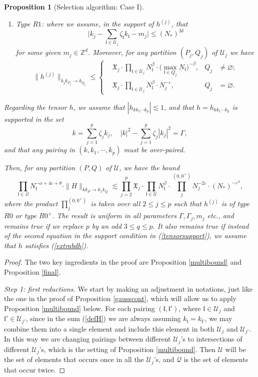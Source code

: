 \documentclass[11 pt,reqno]{amsart}
\newtheorem{prop}[thm]{Proposition}
\theoremstyle{definition}
\theoremstyle{remark}
\numberwithin{equation}{section}
\newcommand{\Qc}{\mathcal{Q}}
\newcommand{\Uc}{\mathcal{U}}
\newcommand{\Zb}{\mathbb{Z}}
\newcommand{\Xf}{\mathfrak{X}}
\newcommand{\lf}{\mathfrak{l}}
\begin{document}
{\begin{prop}[Selection algorithm: Case I]
\begin{enumerate}
\item Type $R1$: where we assume, in the support of $h^{(j)}$, that
\begin{equation}\label{type2}\bigg|k_j-\sum_{\lf\in\Uc_j}\zeta_\lf k_\lf-m_j\bigg|\leq (N_*)^{3\delta}
\end{equation} for some given $m_j\in \Zb^d$. Moreover, for any partition $(P_j,Q_j)$ of $\Uc_j$ we have
\begin{equation}\label{type2bd2}\|h^{(j)}\|_{k_jk_{P_j}\to k_{Q_j}}\leq
\left\{
\begin{aligned}&\Xf_j\cdot \prod_{\lf\in \Uc_j}N_\lf^\beta\cdot \big(\max_{\lf\in Q_j}N_\lf\big)^{-\beta},&Q_j&\neq\varnothing;\\
&\Xf_j\cdot \prod_{\lf\in \Uc_j}N_\lf^\beta\cdot N_j^{-\varepsilon},&Q_j&=\varnothing.
\end{aligned}
\right. 
\end{equation}
\end{enumerate} Regarding the tensor $h$, we assume that $|h_{kk_1\cdots k_p}|\lesssim 1$, and that $h=h_{kk_1\cdots k_p}$ is supported in the set
\begin{equation}
\label{tensorsupport}k=\sum_{j=1}^{p}\zeta_jk_j,\quad |k|^2-\sum_{j=1}^p\zeta_j|k_j|^2=\Gamma,
\end{equation} and that any pairing in $(k,k_1,\cdots,k_p)$ must be over-paired.

Then, for any partition $(P,Q)$ of $\Uc$, we have the bound
\begin{equation}\label{outputbd}\prod_{\lf\in\Qc}N_\lf^{-\alpha+4\varepsilon+\theta}\cdot\|H\|_{kk_P\to k_1k_Q}\lesssim\prod_{j=2}^{p}\Xf_j\cdot\prod_{\lf\in\Uc}N_\lf^\beta\cdot\prod_{j}^{(0,0^+)}N_j^{-2\varepsilon}\cdot(N_*)^{-\varepsilon^3},
\end{equation} where the product $\prod_{j}^{(0,0^+)}$ is taken over all $2\leq j\leq p$ such that $h^{(j)}$ is of type $R0$ or type $R0^+$. The result is uniform in all parameters $\Gamma, \Gamma_j,m_j$ etc., and remains true if we replace $p$ by an odd $3\leq q\leq p$.  It also remains true if instead of the second equation in the support condition in (\ref{tensorsupport}), we assume that $h$ satisfies (\ref{extrabdh}).
  \end{prop}
  \begin{proof} 
  The two key ingredients in the proof are Proposition \ref{multibound} and Proposition \ref{final}.
  
\emph{Step 1: first reductions.} We start by making an adjustment in notations, just like the one in the proof of Proposition \ref{gausscont}, which will allow us to apply Proposition \ref{multibound} below. For each pairing  $(\lf,\lf')$, where $\lf\in \Uc_j$ and $\lf'\in\Uc_{j'}$, since in the sum (\ref{defH}) we are always assuming $k_\lf=k_{\lf'}$, we may combine them into a single element and include this element in both $\Uc_j$ and $\Uc_{j'}$. In this way we are changing pairings between different $\Uc_j$'s to intersections of different $\Uc_j$'s, which is the setting of Proposition \ref{multibound}. Then $\Uc$ will be the set of elements that occurs once in all the $\Uc_j$'s, and $\Qc$ is the set of elements that occur twice.
  

\end{proof}}
\end{document}
